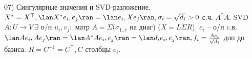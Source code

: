 07) Сингулярные значения и SVD-разложение.\\

$X^* = X^{\top}, \lan X^*e_i, e_j\ran = \lan e_i, Xe_j\ran, \sigma_i = \sqrt{d_i} > 0$ с.ч. $A^*A$. SVD $A \colon U \to V \ \exists$ о/н $u_i, v_j \colon$ матр $A = \Sigma(\sigma_{1..r}$ на диаг) ($X = L\Sigma R$). $e_i$ -- о/н c.в. $\lan Ae_i, Ae_j\ran = \lan A^*Ae_i, e_j\ran = \lan d_ie_i, e_j\ran, f_i = \frac{Ae_i}{\sqrt{d_i}}$ доп до базиса. $R = C^{-1} = C^{\top}, C$ столбцы $e_i$.
